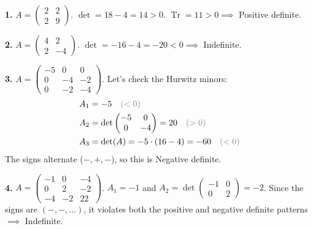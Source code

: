 \begin{example*}
\textbf{1.} $A = \begin{pmatrix} 2 & 2 \\ 2 & 9 \end{pmatrix}$. $\det = 18 - 4 = 14 > 0$. $\operatorname{Tr} = 11 > 0 \implies$ \textcolor{eDarkGreen}{Positive definite}.

\textbf{2.} $A = \begin{pmatrix} 4 & 2 \\ 2 & -4 \end{pmatrix}$. $\det = -16 - 4 = -20 < 0 \implies$ \textcolor{eSaddleBrown}{Indefinite}.


\textbf{3.} $A = \begin{pmatrix} -5 & 0 & 0 \\ 0 & -4 & -2 \\ 0 & -2 & -4 \end{pmatrix}$. Let's check the Hurwitz minors:
\begin{equation}
\begin{aligned}
    A_1 &= -5 \quad \textcolor{eGray}{(< 0)} \\
    A_2 &= \det\begin{pmatrix} -5 & 0 \\ 0 & -4 \end{pmatrix} = 20 \quad \textcolor{eGray}{(> 0)} \\
    A_3 &= \det(A) = -5 \cdot (16 - 4) = -60 \quad \textcolor{eGray}{(< 0)}
\end{aligned}
\end{equation}
The signs alternate ($-, +, -$), so this is \textcolor{eDarkRed}{Negative definite}.

\textbf{4.} $A = \begin{pmatrix} -1 & 0 & -4 \\ 0 & 2 & -2 \\ -4 & -2 & 22 \end{pmatrix}$. 
$A_1 = -1$ and $A_2 = \det\begin{pmatrix} -1 & 0 \\ 0 & 2 \end{pmatrix} = -2$. Since the signs are $(-, -, \dots)$, it violates both the positive and negative definite patterns $\implies$ \textcolor{eSaddleBrown}{Indefinite}.
\end{example*}

